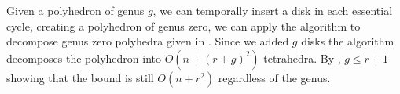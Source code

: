 Given a polyhedron of genus $g$, we can temporally 
insert a disk in each essential cycle, creating a polyhedron
of genus zero, we can apply the algorithm to
decompose genus zero polyhedra given in \cite{triangulating-polytope-1990}.
Since we added $g$ disks the algorithm decomposes
the polyhedron into $O(n+ (r+g)^2)$ tetrahedra.
By , $g\leq r+1$ showing that the bound
is still $O(n+r^2)$ regardless of the genus.

